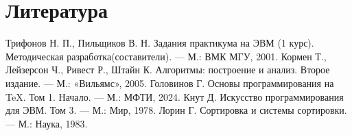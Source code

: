\documentclass[a4paper,10pt]{article}
\begin{document}
    \newpage
    \section{Литература}
    \vspace{0.5cm}

    \begin{thebibliography}{10}
        \vspace{0.5cm}
        \bibitem{}
        Трифонов Н. П., Пильщиков В. Н. Задания практикума на ЭВМ (1 курс). Методическая разработка(составители). — М.: ВМК МГУ, 2001.
        \bibitem{}
        Кормен Т., Лейзерсон Ч., Ривест Р., Штайн К. Алгоритмы: построение и анализ. Второе издание.
        — М.: «Вильямс», 2005.
        \bibitem{}
        Головинов Г.  Основы программирования на TeX. Том 1. Начало. — М.: МФТИ, 2024.
        \bibitem{}
        Кнут Д. Искусство программирования для ЭВМ. Том 3. — М.: Мир, 1978.
        \bibitem{}
        Лорин Г. Сортировка и системы сортировки. — М.: Наука, 1983.
    \end{thebibliography}

    
\end{document}
